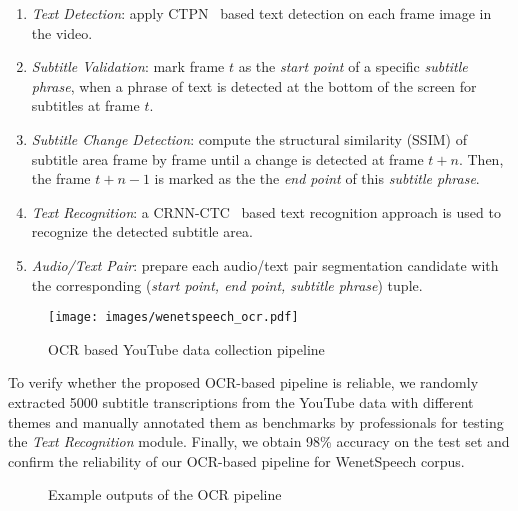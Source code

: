 \documentclass{article}
\begin{document}
\vspace{-0.5em}
\begin{enumerate}
    \setlength{\itemsep}{0pt}
    \item \textit{Text Detection}: apply CTPN~\cite{tian2016detecting} based text detection on each frame image in the video. 
    \item \textit{Subtitle Validation}: mark frame $t$ as the \textit{start point} of a specific \textit{subtitle phrase}, when a phrase of text is detected at the bottom of the screen for subtitles at frame $t$. 
    \item \textit{Subtitle Change Detection}: compute the structural similarity (SSIM) of subtitle area frame by frame until a change is detected at frame $t+n$. Then, the frame $t+n-1$ is marked as the the \textit{end point} of this \textit{subtitle phrase}.
    \item \textit{Text Recognition}: a CRNN-CTC~\cite{shi2016end} based text recognition approach is used to recognize the detected subtitle area.
    \item \textit{Audio/Text Pair}: prepare each audio/text pair segmentation candidate with the corresponding (\textit{start point, end point, subtitle phrase}) tuple.
\end{enumerate}
\begin{figure}[bh]
  \vspace{-1.5em}
  \centering
  \texttt{[image: images/wenetspeech\_ocr.pdf]}
  \vspace{-2em}
  \caption{OCR based YouTube data collection pipeline}
  \label{fig:ocr_pipeline}
  \vspace{-1em}
\end{figure}

To verify whether the proposed OCR-based pipeline is reliable,
we randomly extracted 5000 subtitle transcriptions from the YouTube data with different themes and manually annotated them as benchmarks by professionals for testing the \textit{Text Recognition} module.
Finally, we obtain 98\% accuracy on the test set and confirm the reliability of our OCR-based pipeline for WenetSpeech corpus.

\begin{figure}[th]
\centering
{}
\quad
{}
\quad
{}
\quad
{}
\vspace{-1em}
\caption{Example outputs of the OCR pipeline}
\label{fig:ocr_example}
\vspace{-2em}
\end{figure}
\end{document}
